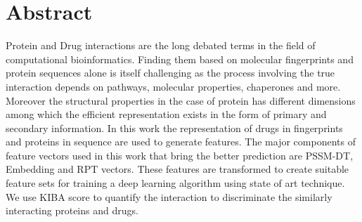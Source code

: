 

\chapter*{Abstract}
\doublespacing
Protein and Drug interactions are the long debated terms in the field of computational bioinformatics. Finding them based on molecular fingerprints and protein sequences alone is itself challenging as the process involving the true interaction depends on pathways, molecular properties, chaperones and more. Moreover the structural properties in the case of protein has different dimensions among which the efficient representation exists in the form of primary and secondary information. In this work the representation of drugs in fingerprints and proteins in sequence are used to generate features. The major components of feature vectors used in this work that bring the better prediction are PSSM-DT, Embedding and RPT vectors. These features are transformed to create suitable feature sets for training a deep learning algorithm using state of art technique. We use KIBA score to quantify the interaction to discriminate the similarly interacting proteins and drugs.